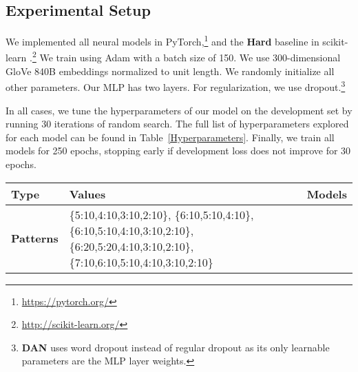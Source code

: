 \documentclass[11pt,a4paper]{article}
\newcommand{\ra}[1]{\renewcommand{\arraystretch}{#1}}
\renewcommand{\cite}[1]{\citep{#1}}
\newcommand{\isection}[2]{\section{#1}\label{sec:#2}}
\newcommand{\tabref}[1]{Table~\ref{#1}}
\newcommand{\camready}[1]{#1}
\begin{document}
\clearpage
\begin{appendices}


\isection{Experimental Setup}{Experimental}

We implemented all neural models in PyTorch,\camready{\footnote{\url{https://pytorch.org/}}}
and the {\bf Hard} baseline in scikit-learn\camready{ \cite{scikit-learn}}.\footnote{\url{http://scikit-learn.org/}}
We train using Adam \cite{Kingma:2014} with a batch size of 150.
We use 300-dimensional GloVe 840B embeddings \cite{Pennington:2014} normalized to unit length.
We randomly initialize all other parameters.
Our MLP has two layers.
For regularization, we use dropout.\footnote{{\bf DAN} uses word dropout instead of regular dropout as its only learnable parameters are the MLP layer weights.}


In all cases, we tune the hyperparameters of our model on the development set by running 30 iterations of random search.
The full list of hyperparameters explored for each model can be found in \tabref{Hyperparameters}.
Finally, we train all models for 250 epochs, stopping early if development loss
does not improve for 30 epochs.


\begin{table}[t]
\ra{1.3}
\scriptsize
\begin{tabularx}{\linewidth}{@{}l X X@{}}
  \toprule
  {\bf Type} & {\bf Values} & {\bf Models} \\
  \midrule
 {\bf Patterns} &
   \{5:10,4:10,3:10,2:10\},
   \{6:10,5:10,4:10\},
   \{6:10,5:10,4:10,3:10,2:10\},
   \{6:20,5:20,4:10,3:10,2:10\},
   \{7:10,6:10,5:10,4:10,3:10,2:10\} &


\end{tabularx}
\end{table}
\end{appendices}
\end{document}
